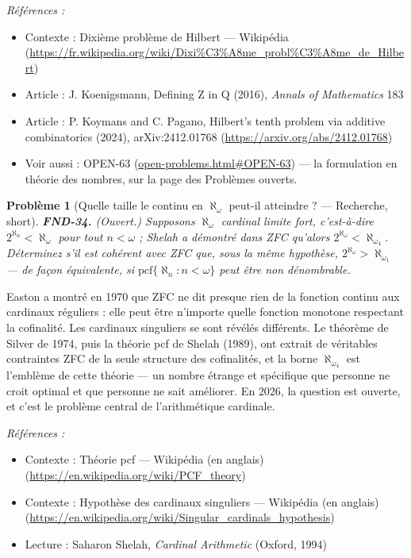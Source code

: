 \documentclass[11pt]{article}
\newtheorem{problem}{Problème}
\newenvironment{refs}{\par\small\noindent\emph{Références :}\begin{itemize}\setlength\itemsep{0pt}}{\end{itemize}\normalsize}
\begin{document}
\begin{refs}
\item Contexte : Dixième problème de Hilbert --- Wikipédia (\url{https://fr.wikipedia.org/wiki/Dixi%C3%A8me_probl%C3%A8me_de_Hilbert})
\item Article : J. Koenigsmann, \og{} Defining Z in Q \fg{} (2016), \textit{Annals of Mathematics} 183
\item Article : P. Koymans and C. Pagano, \og{} Hilbert's tenth problem via additive combinatorics \fg{} (2024), arXiv:2412.01768 (\url{https://arxiv.org/abs/2412.01768})
\item Voir aussi : OPEN-63 (\url{open-problems.html#OPEN-63}) --- la formulation en théorie des nombres, sur la page des Problèmes ouverts.
\end{refs}

\bigskip

\begin{problem}[{Quelle taille le continu en $ \aleph_\omega $ peut-il atteindre ? --- Recherche, short}]
\textbf{FND-34.} (Ouvert.) Supposons $ \aleph_\omega $ cardinal limite fort,
c'est-à-dire $ 2^{\aleph_n} < \aleph_\omega $ pour tout $ n < \omega $ ; Shelah a démontré dans
ZFC qu'alors $ 2^{\aleph_\omega} < \aleph_{\omega_4} $. Déterminez s'il est cohérent
avec ZFC que, sous la même hypothèse, $ 2^{\aleph_\omega} > \aleph_{\omega_1} $ --- de façon
équivalente, si $ \mathrm{pcf}\{\aleph_n : n < \omega\} $ peut être non dénombrable.
\end{problem}

\noindent Easton a montré en 1970 que ZFC ne dit presque rien de la fonction continu aux
cardinaux réguliers : elle peut être n'importe quelle fonction monotone respectant la cofinalité.
Les cardinaux singuliers se sont révélés différents. Le théorème de Silver de 1974, puis la
théorie pcf de Shelah (1989), ont extrait de véritables contraintes ZFC de la seule structure des
cofinalités, et la borne $ \aleph_{\omega_4} $ est l'emblème de cette théorie --- un nombre
étrange et spécifique que personne ne croit optimal et que personne ne sait améliorer. En 2026, la
question est ouverte, et c'est le problème central de l'arithmétique cardinale.

\begin{refs}
\item Contexte : Théorie pcf --- Wikipédia (en anglais) (\url{https://en.wikipedia.org/wiki/PCF_theory})
\item Contexte : Hypothèse des cardinaux singuliers --- Wikipédia (en anglais) (\url{https://en.wikipedia.org/wiki/Singular_cardinals_hypothesis})
\item Lecture : Saharon Shelah, \textit{Cardinal Arithmetic} (Oxford, 1994)
\end{refs}
\end{document}
